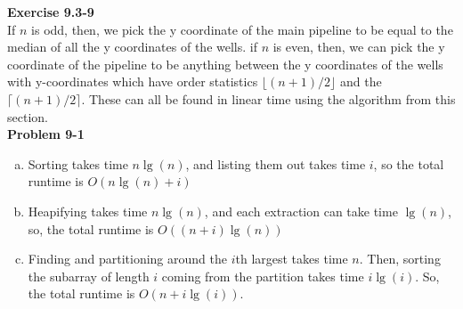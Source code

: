 \documentclass{article}
\begin{document}
\noindent\textbf{ Exercise 9.3-9} \\
If $n$ is odd, then, we pick the y coordinate of the main pipeline to be equal to the median of all the y coordinates of the wells. if $n$ is even, then, we can pick the y coordinate of the pipeline to be anything between the y coordinates of the wells with y-coordinates which have order statistics $\lfloor (n+1)/2\rfloor$ and the $\lceil (n+1)/2 \rceil$. These can all be found in linear time using the algorithm from this section.\\


\noindent\textbf{ Problem 9-1} \\
\begin{enumerate}[a.]
\item
Sorting takes time $n\lg(n)$, and listing them out takes time $i$, so the total runtime is $O(n\lg(n)+i)$

\item
Heapifying takes time $n\lg(n)$, and each extraction can take time $\lg(n)$, so, the total runtime is $O((n+i)\lg(n))$ 

\item
Finding and partitioning around the $i$th largest takes time $n$. Then, sorting the subarray of length $i$ coming from the partition takes time $i\lg(i)$. So, the total runtime is $O(n+i\lg(i))$.

\end{enumerate}
\end{document}
